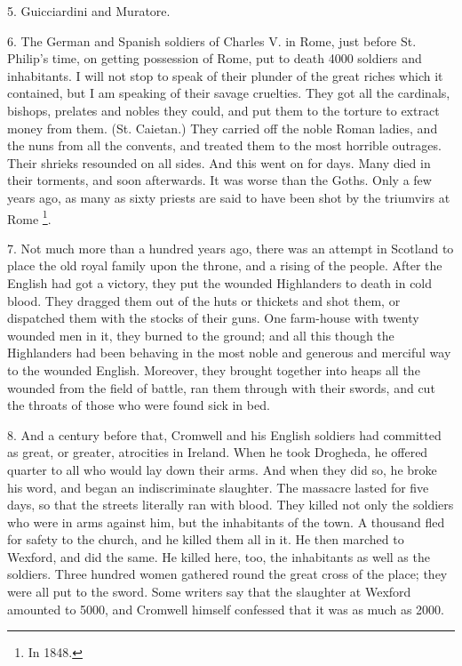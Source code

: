 5. Guicciardini and Muratore.

6. The German and Spanish soldiers of Charles V.
in Rome, just before St. Philip's time, on getting possession of Rome,
put to death 4000 soldiers and inhabitants. I will not stop to speak
of their plunder of the great riches which it contained, but I
am speaking of their savage cruelties. They got all the cardinals,
bishops, prelates and nobles they could, and put them to the torture
to extract money from them. (St. Caietan.) They carried off the noble
Roman ladies, and the nuns from all the convents, and treated them to
the most horrible outrages. Their shrieks resounded on all sides. And
this went on for days. Many died in their torments, and soon
afterwards. It was worse than the Goths. Only a few years ago, as many
as sixty priests are said to have been shot by the triumvirs at Rome \footnote{In 1848.}.

7. Not much more than a hundred years ago, there
was an attempt in Scotland to place the old royal family upon the
throne, and a rising of the people. After the English had got a
victory, they put the wounded Highlanders to death in cold blood. They
dragged them out of the huts or thickets and shot them, or dispatched
them with the stocks of their guns. One farm-house with twenty wounded
men in it, they burned to the ground; and all this though the
Highlanders had been behaving in the most noble and generous and
merciful way to the wounded English. Moreover, they brought together
into heaps all the wounded from the field of battle, ran them through
with their swords, and cut the throats of those who were found sick in
bed.

8. And a century before that, Cromwell and his
English soldiers had committed as great, or greater, atrocities in
Ireland. When he took Drogheda, he offered quarter to all who would
lay down their arms. And when they did so, he broke his word,
and began an indiscriminate slaughter. The massacre lasted for five
days, so that the streets literally ran with blood. They killed not
only the soldiers who were in arms against him, but the inhabitants of
the town. A thousand fled for safety to the church, and he killed them
all in it. He then marched to Wexford, and did the same. He killed
here, too, the inhabitants as well as the soldiers. Three hundred
women gathered round the great cross of the place; they were all put
to the sword. Some writers say that the slaughter at Wexford amounted
to 5000, and Cromwell himself confessed that it was as much as 2000.

